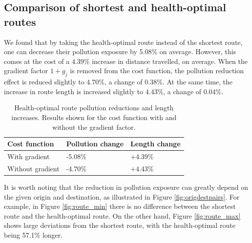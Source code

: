 \documentclass[11pt,twosided,a4paper]{report}
\begin{document}

\subsection{Comparison of shortest and health-optimal routes}

We found that by taking the health-optimal route instead of the shortest route, one can decrease their pollution exposure by 5.08\% on average. However, this comes at the cost of a 4.39\% increase in distance travelled, on average. When the gradient factor $1+g_j$ is removed from the cost function, the pollution reduction effect is reduced slightly to 4.70\%, a change of 0.38\%. At the same time, the increase in route length is increased slightly to 4.43\%, a change of 0.04\%.

\begin{table}[!tbp]
  \centering
  \caption{Health-optimal route pollution reductions and length increases. Results shown for the cost function with and without the gradient factor.}
  \label{tab:pollution_reductions}
  \begin{tabular}{ l l l }
  \toprule
  Cost function & Pollution change & Length change \\ \midrule
  With gradient & -5.08\% & +4.39\% \\
  Without gradient & -4.70\% & +4.43\% \\ \bottomrule
  \end{tabular}
\end{table}


It is worth noting that the reduction in pollution exposure can greatly depend on the given origin and destination, as illustrated in Figure \ref{fig:origdestpairs}. For example, in Figure \ref{fig:route_min} there is no difference between the shortest route and the health-optimal route. On the other hand, Figure \ref{fig:route_max} shows large deviations from the shortest route, with the health-optimal route being 57.1\% longer.
\end{document}
